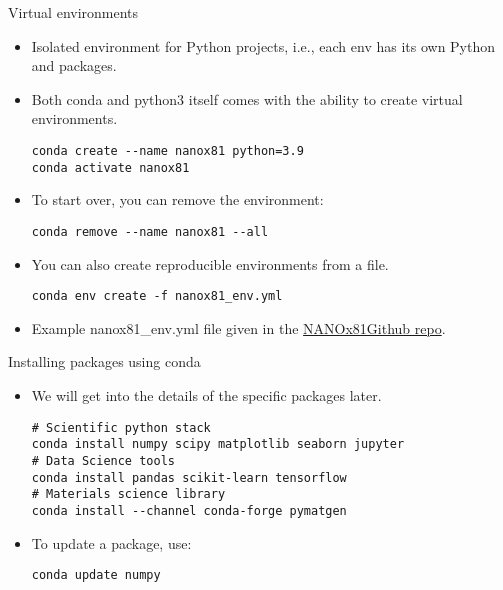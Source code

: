\documentclass[aspectratio=169]{beamer}
\newcommand{\classname}{NANOx81}
\begin{document}
    \begin{frame}[fragile]{Virtual environments}
        \begin{itemize}
            \item Isolated environment for Python projects, i.e., each env has its own Python and packages.
            \item Both conda and python3 itself comes with the ability to create virtual environments.
            \begin{verbatim}
conda create --name nanox81 python=3.9
conda activate nanox81
            \end{verbatim}
            \item To start over, you can remove the environment:
            \begin{verbatim}
conda remove --name nanox81 --all
            \end{verbatim}
            \item You can also create reproducible environments from a file.
            \begin{verbatim}
conda env create -f nanox81_env.yml
            \end{verbatim}
            \item Example nanox81\_env.yml file given in the \href{https://github.com/materialsvirtuallab/\classname}{\classname Github repo}.
        \end{itemize}
    \end{frame}


    \begin{frame}[fragile]{Installing packages using conda}
        \begin{itemize}
            \item We will get into the details of the specific packages later.
            \begin{verbatim}
# Scientific python stack
conda install numpy scipy matplotlib seaborn jupyter
# Data Science tools
conda install pandas scikit-learn tensorflow
# Materials science library
conda install --channel conda-forge pymatgen
            \end{verbatim}
            \item To update a package, use:
            \begin{verbatim}
conda update numpy
            \end{verbatim}
        \end{itemize}
    \end{frame}
\end{document}
